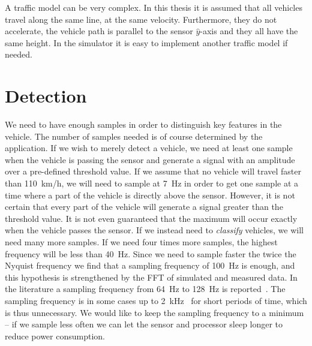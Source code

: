 A traffic model can be very complex. In this thesis it is assumed that all vehicles travel along the same line, at the same velocity. Furthermore, they do not accelerate, the vehicle path is parallel to the sensor $\hat{y}$-axis and they all have the same height. In the simulator it is easy to implement another traffic model if needed.

\section{Detection}

We need to have enough samples in order to distinguish key features in the vehicle. The number of samples needed is of course determined by the application. If we wish to merely detect a vehicle, we need at least one sample when the vehicle is passing the sensor and generate a signal with an amplitude over a pre-defined threshold value. If we assume that no vehicle will travel faster than 110~km/h, we will need to sample at 7~Hz in order to get one sample at a time where a part of the vehicle is directly above the sensor. However, it is not certain that every part of the vehicle will generate a signal greater than the threshold value. It is not even guaranteed that the maximum will occur exactly when the vehicle passes the sensor. If we instead need to \emph{classify} vehicles, we will need many more samples. If we need four times more samples, the highest frequency will be less than 40~Hz. Since we need to sample faster the twice the Nyquist frequency we find that a sampling frequency of \mbox{100~Hz} is enough, and this hypothesis is strengthened by the FFT of simulated and measured data. In the literature a sampling frequency from 64~Hz to 128~Hz is reported~\cite{cheung2005-2}. The sampling frequency is in some cases up to 2~kHz~\cite{knaian2000} for short periods of time, which is thus unnecessary. We would like to keep the sampling frequency to a minimum -- if we sample less often we can let the sensor and processor sleep longer to reduce power consumption.

